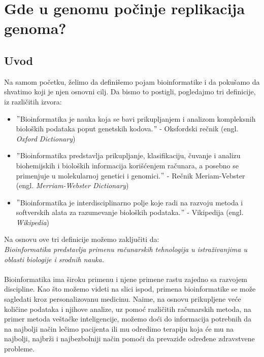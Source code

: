 \chapter{Gde u genomu počinje replikacija genoma?}
\setbookcodestyle

\section{Uvod}
\label{sec:uvod}

Na samom početku, želimo da definišemo pojam bioinformatike i da pokušamo da shvatimo koji je njen osnovni cilj. Da bismo to postigli, pogledajmo tri definicije, iz različitih izvora:

\begin{itemize}
  \item $"$Bioinformatika je nauka koja se bavi prikupljanjem i analizom kompleksnih bioloških podataka poput genetskih kodova.$"$ - Oksfordski rečnik (engl. \textit{Oxford Dictionary})
  \item $"$Bioinformatika predstavlja prikupljanje, klasifikaciju, čuvanje i analizu biohemijskih i bioloških informacija korišćenjem računara, a posebno se primenjuje u molekularnoj genetici i genomici.$"$ - Rečnik Meriam-Vebster (engl. \textit{Merriam-Webster Dictionary}) 
 \item $"$Bioinformatika je interdisciplinarno polje koje radi na razvoju metoda i softverskih alata za razumevanje bioloških podataka.$"$ - Vikipedija (engl. \textit{Wikipedia}) 
\end{itemize}

Na osnovu ove tri definicije možemo zaključiti da:\\
\textit{Bioinformatika predstavlja primenu računarskih tehnologija u istraživanjima u oblasti biologije i srodnih nauka.}\\\\
Bioinformatika ima široku primenu i njene primene rastu zajedno sa razvojem discipline. Kao što možemo videti na slici ispod, primena bioinformatike se može sagledati kroz personalizovanu medicinu. Naime, na osnovu prikupljene veće količine podataka i njihove analize, uz pomoć različitih računarskih metoda, na primer metoda veštačke inteligencije, možemo doći do informacija potrebnih da na najbolji način lečimo pacijenta ili mu odredimo terapiju koja će mu na najbolji, najbrži i najbezbolniji način pomoći da prevaziđe određene zdravstvene probleme.  \\

